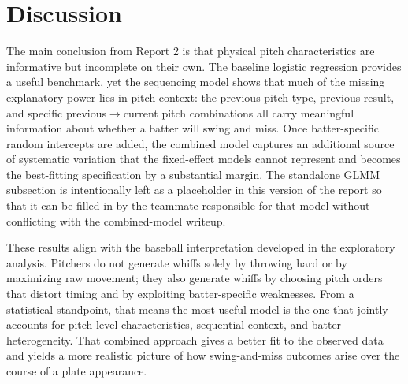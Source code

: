 \documentclass[11pt]{article}
\begin{document}
\section{Discussion}

The main conclusion from Report 2 is that physical pitch characteristics are informative but incomplete on their own.
The baseline logistic regression provides a useful benchmark, yet the sequencing model shows that much of the missing explanatory power lies in pitch context: the previous pitch type, previous result, and specific previous$\rightarrow$current pitch combinations all carry meaningful information about whether a batter will swing and miss.
Once batter-specific random intercepts are added, the combined model captures an additional source of systematic variation that the fixed-effect models cannot represent and becomes the best-fitting specification by a substantial margin.
The standalone GLMM subsection is intentionally left as a placeholder in this version of the report so that it can be filled in by the teammate responsible for that model without conflicting with the combined-model writeup.

These results align with the baseball interpretation developed in the exploratory analysis.
Pitchers do not generate whiffs solely by throwing hard or by maximizing raw movement; they also generate whiffs by choosing pitch orders that distort timing and by exploiting batter-specific weaknesses.
From a statistical standpoint, that means the most useful model is the one that jointly accounts for pitch-level characteristics, sequential context, and batter heterogeneity.
That combined approach gives a better fit to the observed data and yields a more realistic picture of how swing-and-miss outcomes arise over the course of a plate appearance.


\newpage


\end{document}
